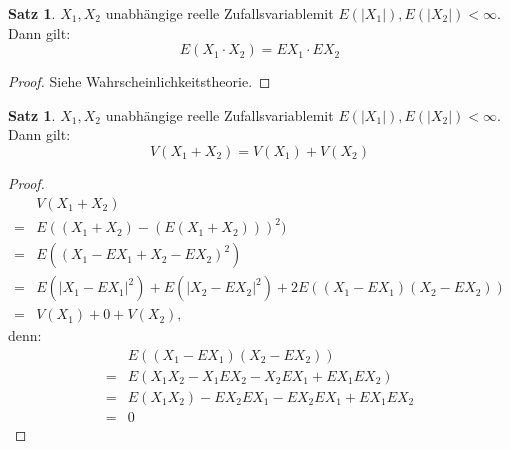 \documentclass[a4paper,12pt,fleqn]{scrartcl}
\newcommand{\ZV}{Zufallsvariable}
\theoremstyle{definition}
\newtheorem{satz}[definition]{Satz}
\theoremstyle{plain}
\theoremstyle{remark}
\begin{document}
\begin{satz}
$X_1,X_2$ unabhängige reelle \ZV mit $E(|X_1|),E(|X_2|)<\infty$. Dann gilt:
\[E(X_1\cdot X_2)=EX_1\cdot EX_2\]
\end{satz}
\begin{proof}
Siehe Wahrscheinlichkeitstheorie.
\end{proof}
\begin{satz}
$X_1,X_2$ unabhängige reelle \ZV mit $E(|X_1|),E(|X_2|)<\infty$. Dann gilt:
\[V(X_1+X_2)=V(X_1)+V(X_2)\]
\end{satz}
\begin{proof}
\begin{align*}
&V(X_1+X_2)\\
=&E((X_1+X_2)-(E(X_1+X_2)))^2)\\
=&E((X_1-EX_1+X_2-EX_2)^2)\\
=&E(|X_1-EX_1|^2)+E(|X_2-EX_2|^2)+2E((X_1-EX_1)(X_2-EX_2))\\
=&V(X_1)+0+V(X_2),
\end{align*}
denn:
\begin{align*}
&E((X_1-EX_1)(X_2-EX_2))\\
=&E(X_1X_2-X_1EX_2-X_2EX_1+EX_1EX_2)\\
=&E(X_1X_2)-EX_2EX_1-EX_2EX_1+EX_1EX_2\\
=&0 \tag{Satz 5.34}
\end{align*}
\end{proof}
\end{document}
